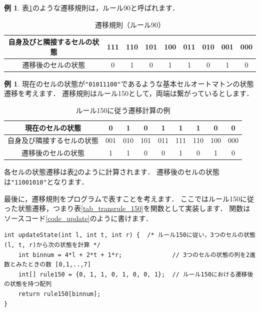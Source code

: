 \documentclass[dvipdfmx]{jsarticle}
\theoremstyle{definition}
\newtheorem{example}[definition]{例}
\begin{document}
\begin{example}
    \label{ex_transrule}
    表\ref{tab_transrule_90}のような遷移規則は，ルール90と呼ばれます．
    \begin{table}[H]
        \caption{遷移規則（ルール90）}
        \label{tab_transrule_90}
        \centering
        \begin{tabular}{|c||c|c|c|c|c|c|c|c|} \hline
            自身及びと隣接するセルの状態 & 111 & 110 & 101 & 100 & 011 & 010 & 001 & 000 \\ \hline
            遷移後のセルの状態      &  0   &  1  &  0  &  1  &  1  &  0  &  1  &  0 \\ \hline
        \end{tabular}
    \end{table}
\end{example}

\begin{example}
    \label{ex_update_gen}
    現在のセルの状態が\verb|"01011100"|であるような基本セルオートマトンの状態遷移を考えます．
    遷移規則はルール150として，両端は繋がっているとします．
    \begin{table}[H]
        \caption{ルール150に従う遷移計算の例}
        \label{tab_ex_update_gen}
        \centering
        \begin{tabular}{|c||c|c|c|c|c|c|c|c|} \hline
            現在のセルの状態 & 0 & 1 & 0 & 1 & 1 & 1 & 0 & 0 \\ \hline
            自身及び隣接するセルの状態 & 001 & 010 & 101 & 011 & 111 & 110 & 100 & 000 \\ \hline
            遷移後のセルの状態 & 1 & 1 & 0 & 0 & 1 & 0 & 1 & 0 \\ \hline
        \end{tabular}
    \end{table}
    各セルの状態遷移は表\ref{tab_ex_update_gen}のように計算されます．
    遷移後のセルの状態は\verb|"11001010"|となります．
\end{example}

最後に，遷移規則をプログラムで表すことを考えます．
ここではルール150に従った状態遷移，つまり表\ref{tab_transrule_150}を関数として実装します．
関数はソースコード\ref{code_update}のように書けます．

\begin{lstlisting}[caption=ルール150に基づく遷移を計算する関数, label=code_update]
int updateState(int l, int t, int r) {  /* ルール150に従い，3つのセルの状態(l, t, r)から次の状態を計算 */
    int binnum = 4*l + 2*t + 1*r;              // 3つのセルの状態の列を2進数とみたときの数 [0,1,..,7]
    int[] rule150 = {0, 1, 1, 0, 1, 0, 0, 1};  // ルール150における遷移後の状態を持つ配列
    return rule150[binnum];
}
\end{lstlisting}
\end{document}
